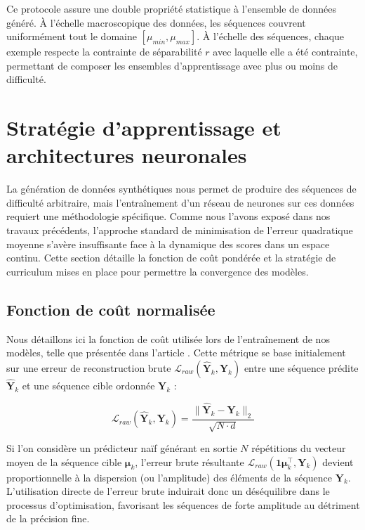 Ce protocole assure une double propriété statistique à l'ensemble de données généré. À l'échelle macroscopique des données, les séquences couvrent uniformément tout le domaine  $[\mu_{min}, \mu_{max}]$. À l'échelle des séquences, chaque exemple respecte la contrainte de séparabilité $r$ avec laquelle elle a été contrainte, permettant de composer les ensembles d'apprentissage avec plus ou moins de difficulté.

\section{Stratégie d'apprentissage et architectures neuronales}
La génération de données synthétiques nous permet de produire des séquences de difficulté arbitraire, mais l'entraînement d'un réseau de neurones sur ces données requiert une méthodologie spécifique. Comme nous l'avons exposé dans nos travaux précédents, l'approche standard de minimisation de l'erreur quadratique moyenne s'avère insuffisante face à la dynamique des scores dans un espace continu. Cette section détaille la fonction de coût pondérée et la stratégie de curriculum mises en place pour permettre la convergence des modèles.

\subsection{Fonction de coût normalisée}
\label{seq:errnorm}
Nous détaillons ici la fonction de coût utilisée lors de l'entraînement de nos modèles, telle que présentée dans l'article \cite{cornu_learning_2025}. Cette métrique se base initialement sur une erreur de reconstruction brute $\mathcal{L}_{raw}(\hat{\mathbf{Y}}_k, \mathbf{Y}_k)$ entre une séquence prédite $\hat{\mathbf{Y}}_k$ et une séquence cible ordonnée $\mathbf{Y}_k$ :

\begin{equation}
\label{eq:raweusipco}
    \mathcal{L}_{raw}(\hat{\mathbf{Y}}_k, \mathbf{Y}_k) = \frac{\| \hat{\mathbf{Y}}_k - \mathbf{Y}_k \|_2}{\sqrt{N \cdot d}}
\end{equation}

Si l'on considère un prédicteur naïf générant en sortie $N$ répétitions du vecteur moyen de la séquence cible $\boldsymbol{\mu}_k$, l'erreur brute résultante $\mathcal{L}_{raw}(\mathbf{1}\boldsymbol{\mu}_k^\top, \mathbf{Y}_k)$ devient proportionnelle à la dispersion (ou l'amplitude) des éléments de la séquence $\mathbf{Y}_k$. L'utilisation directe de l'erreur brute induirait donc un déséquilibre dans le processus d'optimisation, favorisant les séquences de forte amplitude au détriment de la précision fine.

